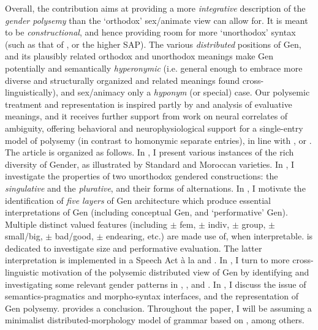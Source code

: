 Overall, the contribution aims at providing a more \emph{integrative}
description of the \textit{gender polysemy} than the `orthodox' sex/animate
view can allow for. It is meant to be \textit{constructional}, and hence
providing room for more `unorthodox' syntax (such as that of , or the higher
SAP). The various \textit{distributed} positions of Gen, and its plausibly
related orthodox and unorthodox meanings make Gen potentially and semantically
\textit{hyperonymic} (i.e. general enough to embrace more diverse and
structurally organized and related meanings found cross-linguistically), and
sex/animacy only a \textit{hyponym} (or special) case. Our polysemic treatment
and representation is inspired partly by \citet{Jurafsky1996} and
\citet{Grandi2015} analysis of evaluative meanings, and it receives further
support from work on neural correlates of  ambiguity, offering
behavioral and neurophysiological support for a single-entry model of polysemy
(in contrast to homonymic separate entries), in line with
\citet{BerettaEtAl2005,PylkkanenEtAl2006}, or
\citet{Marantz2005}.
The article is organized as follows. In , I present
various instances of the rich  diversity of Gender, as illustrated by
Standard and Moroccan  varieties. In , I
investigate the properties of two unorthodox gendered constructions: the
\textit{singulative} and the \textit{plurative}, and their forms of 
alternations. In , I motivate the identification of
\textit{five layers} of Gen architecture which produce essential
interpretations of Gen (including conceptual Gen, and `performative' Gen).
Multiple distinct valued features (including $\pm$ fem, $\pm$ indiv, $\pm$
group, $\pm$ small/big, $\pm$ bad/good, $\pm$ endearing, etc.) are made use of,
when interpretable.  is dedicated to
investigate size and performative evaluation. The latter interpretation is
implemented in a Speech Act  à la \citet{SpeasEtAl2003} and
\citet{Hill2014}. In , I turn to more cross-
linguistic motivation of the polysemic distributed view of Gen by identifying
and investigating some relevant gender patterns in , , and .
In , I discuss the issue of semantics-pragmatics and
morpho-syntax interfaces, and the representation of Gen polysemy.
 provides a conclusion. Throughout the paper, I
will be assuming a minimalist distributed-morphology model of grammar based
on \citet{Chomsky1995,HalleEtAl1993,Marantz1997,Harley2014}, among others.


